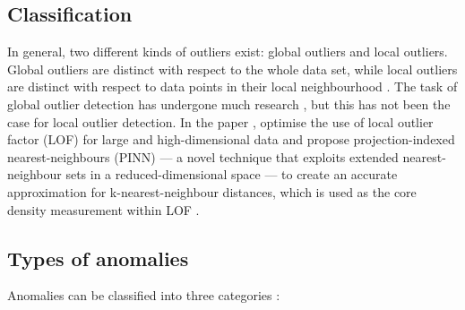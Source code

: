 \subsection{Classification}
\label{sec:anomalyClassification}
In general, two different kinds of outliers exist: global outliers and local 
outliers. Global outliers are distinct with respect to the whole data set, while
local outliers are distinct with respect to data points in their local 
neighbourhood \cite{Vries:2011}. The task of global outlier detection has 
undergone much research \citeneeded{}, but this has not been the case for local 
outlier detection. In the paper , \citeauthor{Vries:2011} 
optimise the use of local outlier factor (LOF) for large and high-dimensional 
data and propose projection-indexed nearest-neighbours (PINN) --- a novel 
technique that exploits extended nearest-neighbour sets in a reduced-dimensional
space --- to create an accurate approximation for k-nearest-neighbour distances, 
which is used as the core density measurement within LOF \cite{Vries:2011}.

\subsection{Types of anomalies}
\label{sec:typesOfAnomalies}
Anomalies can be classified into three categories \cite{Chandola:2007}:

